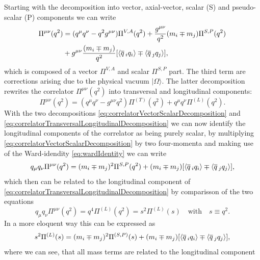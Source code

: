 \documentclass[../../index.tex]{subfiles}
\begin{document}
Starting with the decomposition into vector, axial-vector, scalar (S) and pseudo-scalar (P) components we can
write \cite{Broadhurst1981,Jamin1992}
\begin{equation}
  \label{eq:correlatorVectorScalarDecomposition}
  \begin{split}
    \Pi^{\mu\nu}(q^2) &= (q^\mu q^\nu - q^2 g^{\mu\nu}) \Pi^{V,A}(q^2) + \frac{g^{\mu\nu}}{q^2} (m_i \mp m_j)\Pi^{S,P}(q^2) \\
    &+ g^{\mu\nu}\frac{(m_i \mp m_j)}{q^2} [ \langle \overline{q}\,_i q_i \rangle \mp \langle \overline{q}\,_j q_j \rangle],
  \end{split}
\end{equation}
which is composed of a vector $\Pi^{V,A}$ and scalar $\Pi^{S,P}$ part. The third
term are corrections arising due to the physical vacuum $|\Omega\rangle$. The
latter decomposition rewrites the correlator $\Pi^{\mu\nu}(q^2)$ into transversal
and longitudinal components:
\begin{equation}
  \label{eq:correlatorTransversalLongitudinalDecomposition}
  \Pi^{\mu\nu}(q^2) = (q^\mu q^\nu - g^{\mu\nu}q^2) \Pi^{(T)}(q^2) + q^\mu q^\nu \Pi^{(L)}(q^2).
\end{equation}
With the two decompositions \cref{eq:correlatorVectorScalarDecomposition} and
\cref{eq:correlatorTransversalLongitudinalDecomposition} we can now identify the
longitudinal components of the correlator as being purely scalar, by multiplying
\cref{eq:correlatorVectorScalarDecomposition} by two four-momenta and making use
of the Ward-idendity \cref{eq:wardIdentity} we can write
\begin{equation}
  q_\mu q_\nu \Pi^{\mu\nu}(q^2) = (m_i \mp m_j)^2 \Pi^{S,P}(q^2) + (m_i \mp m_j)[\langle \overline{q}\,_i q_i \rangle \mp \langle \overline{q}\,_j q_j \rangle],
\end{equation}
which then can be related to the longitudinal component of
\cref{eq:correlatorTransversalLongitudinalDecomposition} by comparisson of the
two equations
\begin{equation}
  q_\mu q_\nu \Pi^{\mu\nu}(q^2) = q^4 \Pi^{(L)}(q^2) = s^2 \Pi^{(L)}(s) \quad \text{with} \quad s\equiv q^2.
\end{equation}
In a more eloquent way this can be expressed as
\begin{equation}
  s^2 \Pi^{(L)}(s) = (m_i \mp m_j)^2 \Pi^{(S,P)}(s) + (m_i \mp m_j)[ \langle \overline{q}\,_i q_i \rangle \mp \langle \overline{q}\,_j q_j \rangle],
\end{equation}
where we can see, that all mass terms are related to the longitudinal component
\end{document}
